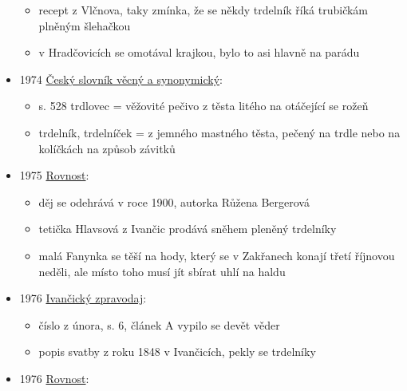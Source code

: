 \begin{itemize}
  \begin{itemize}
  \tightlist
  \item
    recept z Vlčnova, taky zmínka, že se někdy trdelník říká trubičkám
    plněným šlehačkou
  \item
    v Hradčovicích se omotával krajkou, bylo to asi hlavně na parádu
  \end{itemize}
\item
  1974
  \href{https://ceskadigitalniknihovna.cz/uuid/uuid:9a981180-f289-11ea-9c2e-005056827e51}{Český
  slovník věcný a synonymický}:

  \begin{itemize}
  \tightlist
  \item
    s. 528 trdlovec = věžovité pečivo z těsta litého na otáčející se
    rožeň
  \item
    trdelník, trdelníček = z jemného mastného těsta, pečený na trdle
    nebo na kolíčkách na způsob závitků
  \end{itemize}
\item
  1975
  \href{https://ceskadigitalniknihovna.cz/view/uuid:b23f9410-20b3-11ee-a8bd-005056827e51?page=uuid\%3A00d297d0-20cd-11ee-9137-005056822549&fulltext=trdeln\%C3\%ADk\%20OR\%20trdeln\%C3\%ADky\%20OR\%20trdeln\%C3\%ADk\%C5\%AF&source=mzk}{Rovnost}:

  \begin{itemize}
  \tightlist
  \item
    děj se odehrává v roce 1900, autorka Růžena Bergerová
  \item
    tetička Hlavsová z Ivančic prodává sněhem pleněný trdelníky
  \item
    malá Fanynka se těší na hody, který se v Zakřanech konají třetí
    říjnovou neděli, ale místo toho musí jít sbírat uhlí na haldu
  \end{itemize}
\item
  1976
  \href{https://ceskadigitalniknihovna.cz/view/uuid:ed1e8590-5937-11e2-b816-001018b5eb5c?page=uuid:42702f2d-2ffb-ed27-fb9d-4071dce2a1d8&fulltext=trdeln\%C3\%ADk\%20OR\%20trdeln\%C3\%ADky\%20OR\%20trdeln\%C3\%ADku\%20&source=mzk}{Ivančický
  zpravodaj}:

  \begin{itemize}
  \tightlist
  \item
    číslo z února, s. 6, článek A vypilo se devět věder
  \item
    popis svatby z roku 1848 v Ivančicích, pekly se trdelníky
  \end{itemize}
\item
  1976
  \href{https://ceskadigitalniknihovna.cz/view/uuid:c28d9bc0-d57e-11ee-8ea1-5ef3fc9bb22f?page=uuid\%3A97237c77-34d2-4422-98b3-6d767baeb2bd&fulltext=trdeln\%C3\%ADk\%20OR\%20trdeln\%C3\%ADky\%20OR\%20trdeln\%C3\%ADk\%C5\%AF&source=mzk}{Rovnost}:


\end{itemize}
